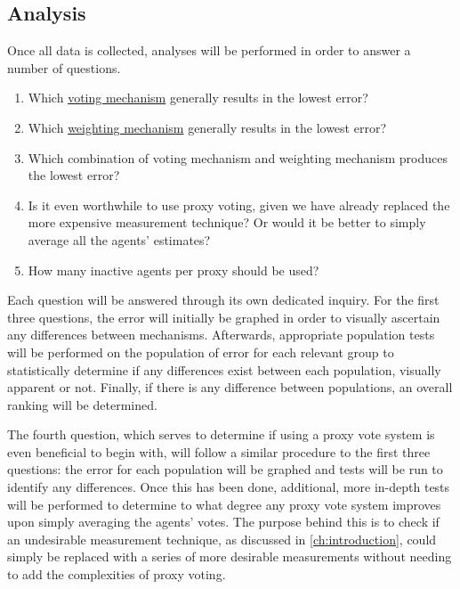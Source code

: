 \subsection{Analysis}\label{subsec:analysis}
Once all data is collected, analyses will be performed in order to answer a
number of questions.
\begin{enumerate}[label=\textbf{Q\arabic*}., leftmargin=2\parindent]
    \item Which \hyperref[subsec:voting-mechanisms]{voting mechanism}
    generally results in the lowest error?

    \item Which \hyperref[subsec:weighting-mechanisms]{weighting mechanism}
    generally results in the lowest error?

    \item Which combination of voting mechanism and weighting mechanism
    produces the lowest error?

    \item Is it even worthwhile to use proxy voting, given we have already replaced
    the more expensive measurement technique?
    Or would it be better to simply average all the agents' estimates?

    \item How many inactive agents per proxy should be used?
\end{enumerate}

Each question will be answered through its own dedicated inquiry.
For the first three questions, the error will initially be graphed in order to
visually ascertain any differences between mechanisms.
Afterwards, appropriate population tests will be performed on the population of error
for each relevant group to statistically determine if any differences exist between
each population, visually apparent or not.
Finally, if there is any difference between populations, an overall ranking will be
determined.

The fourth question, which serves to determine if using a proxy vote system is even
beneficial to begin with, will follow a similar procedure to the first three
questions: the error for each population will be graphed and tests will be run to
identify any differences.
Once this has been done, additional, more in-depth tests will be performed to
determine to what degree any proxy vote system improves upon simply averaging the
agents' votes.
The purpose behind this is to check if an undesirable measurement technique, as
discussed in \autoref{ch:introduction}, could simply be replaced with a series of
more desirable measurements without needing to add the complexities of proxy voting.

